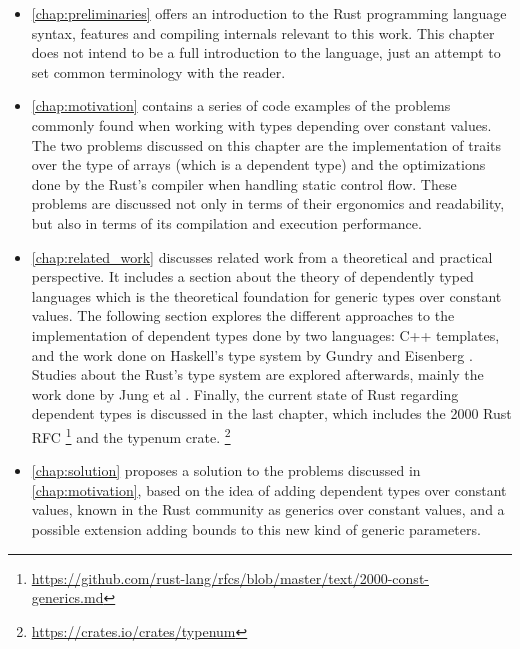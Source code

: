 \begin{itemize}
    \item \ref{chap:preliminaries} offers an introduction to the Rust programming language syntax, features and compiling internals relevant to this work. This chapter does not intend to be a full introduction to the language, just an attempt to set common terminology with the reader.
    \item \ref{chap:motivation} contains a series of code examples of the problems commonly found when working with types depending over constant values. The two problems discussed on this chapter are the implementation of traits over the type of arrays (which is a dependent type) and the optimizations done by the Rust's compiler when handling static control flow. These problems are discussed not only in terms of their ergonomics and readability, but also in terms of its compilation and execution performance.
    \item \ref{chap:related_work} discusses related work from a theoretical and practical perspective. It includes a section about the theory of dependently typed languages which is the theoretical foundation for generic types over constant values. The following section explores the different approaches to the implementation of dependent types done by two languages: C++ templates, and the work done on Haskell's type system by Gundry \cite{gundry} and Eisenberg \cite{eisenberg}. Studies about the Rust's type system are explored afterwards, mainly the work done by Jung et al \cite{ralf}. Finally, the current state of Rust regarding dependent types is discussed in the last chapter, which includes the 2000 Rust RFC \footnote{\url{https://github.com/rust-lang/rfcs/blob/master/text/2000-const-generics.md}} and the typenum crate. \footnote{\url{https://crates.io/crates/typenum}}
    \item \ref{chap:solution} proposes a solution to the problems discussed in \ref{chap:motivation}, based on the idea of adding dependent types over constant values, known in the Rust community as generics over constant values, and a possible extension adding bounds to this new kind of generic parameters.
\end{itemize}
